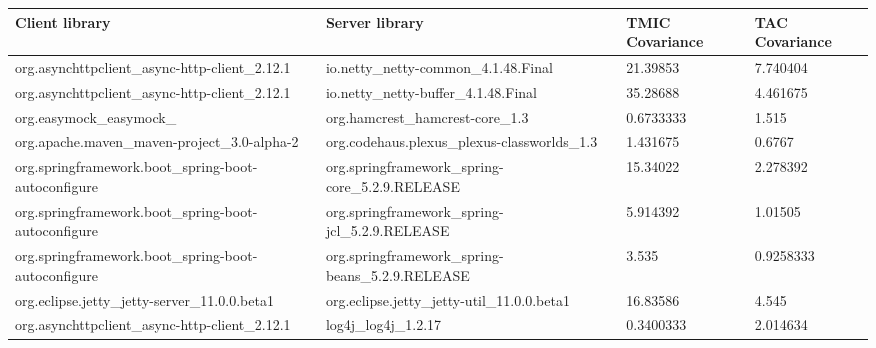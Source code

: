 \begin{table}[ht!]
\begin{center}
\begin{tabularx}{\textwidth}{|X|X|l|l|}
\hline
\textbf{Client   library} & \textbf{Server library} & \textbf{TMIC Covariance} & \textbf{TAC Covariance} \\ \hline
org.asynchttpclient\_\newline async-http-client\_2.12.1 & io.netty\_netty-common\_4.1.48.Final & 21.39853 & 7.740404 \\ \hline
org.asynchttpclient\_\newline async-http-client\_2.12.1 & io.netty\_netty-buffer\_4.1.48.Final & 35.28688 & 4.461675 \\ \hline
org.easymock\_easymock\_\newline 4.2 & org.hamcrest\_\newline hamcrest-core\_1.3 & 0.6733333 & 1.515 \\ \hline
org.apache.maven\_maven-project\_3.0-alpha-2 & org.codehaus.plexus\_\newline plexus-classworlds\_1.3 & 1.431675 & 0.6767 \\ \hline
org.springframework.\newline boot\_spring-boot-\newline autoconfigure & org.springframework\_\newline spring-core\_5.2.9.RELEASE & 15.34022 & 2.278392 \\ \hline
org.springframework.\newline boot\_spring-boot-\newline autoconfigure & org.springframework\_\newline spring-jcl\_5.2.9.\newline RELEASE & 5.914392 & 1.01505 \\ \hline
org.springframework.\newline boot\_spring-boot-\newline autoconfigure & org.springframework\_\newline spring-beans\_5.2.9.RELEASE & 3.535 & 0.9258333 \\ \hline
org.eclipse.jetty\_jetty-server\_11.0.0.beta1 & org.eclipse.jetty\_jetty-util\_11.0.0.beta1 & 16.83586 & 4.545 \\ \hline
org.asynchttpclient\_\newline async-http-client\_2.12.1 & log4j\_log4j\_1.2.17 & 0.3400333 & 2.014634 \\ \hline

\end{tabularx}
\end{center}
\end{table}
